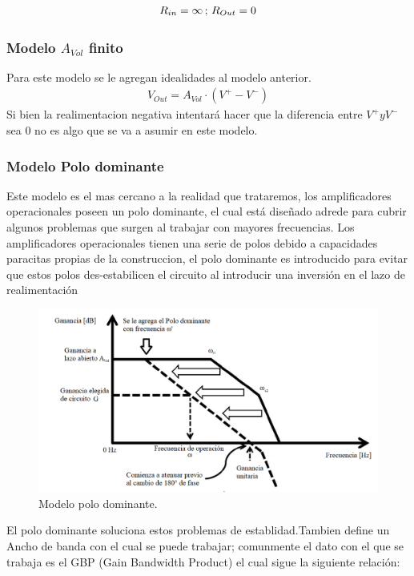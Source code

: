 \begin{align} R_{in}=\infty   \thinspace;\thinspace R_{Out} = 0 \end{align}
\subsubsection{Modelo $A_{Vol}$ finito}
Para este modelo se le agregan idealidades al modelo anterior.
\begin{align}V_{Out} = A_{Vol} \cdot (V^+ - V^-)
\label{eq:vout}
\end{align}
Si bien la realimentacion negativa intentará hacer que la diferencia entre $V^+ y V^-$ sea 0 no es algo que se va a asumir en este modelo.
\subsubsection{Modelo Polo dominante}
Este modelo es el mas cercano a la realidad que trataremos, los amplificadores operacionales poseen un polo dominante, el cual está diseñado adrede para cubrir algunos problemas que surgen
al trabajar con mayores frecuencias. Los amplificadores operacionales tienen una serie de polos debido a capacidades paracitas propias de la construccion, el  polo dominante es introducido para evitar que estos polos des-estabilicen el circuito al introducir una inversión en el lazo de realimentación 
\begin{figure}[H]	
	\centering
	\includegraphics[width=\textwidth]{Ejercicio1/Imagenes/dompole.png}
	\caption{Modelo polo dominante.}
	\label{fig:dompole}
\end{figure}
El polo dominante soluciona estos problemas de establidad.Tambien define un Ancho de banda con el cual se puede trabajar; comunmente el dato con el que se trabaja es el GBP (Gain Bandwidth Product) el cual sigue la siguiente relación:
